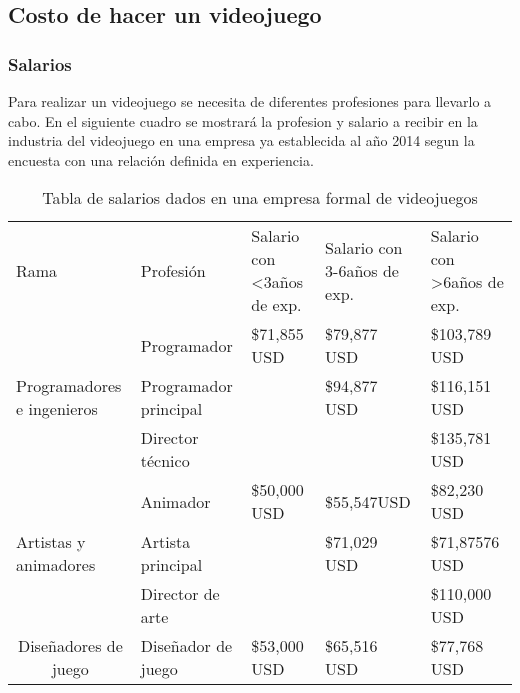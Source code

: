 \subsection{Costo de hacer un videojuego}\label{costoVJ}

	
\subsubsection{Salarios}
Para realizar un videojuego se necesita de diferentes profesiones para llevarlo a cabo.
En el siguiente cuadro se mostrará la profesion y salario a recibir en la industria del videojuego en una empresa ya establecida al año 2014 segun la encuesta con una relación definida en experiencia.

\begin{table}[]
	\centering
	\caption{Tabla de salarios dados en una empresa formal de videojuegos}
	\label{tablacostos}
	\begin{tabular}{lllll}
		Rama                                                      & Profesión                   & Salario con \textless 3años de exp. & Salario con 3-6años de exp. & Salario con \textgreater 6años de exp. \\
		\multirow{3}{*}{Programadores e ingenieros}               & Programador                 & \$71,855 USD                        & \$79,877 USD                & \$103,789 USD                          \\
		& Programador principal       &                                     & \$94,877 USD                & \$116,151 USD                          \\
		& Director técnico            &                                     &                             & \$135,781 USD                          \\
		\multirow{3}{*}{Artistas y animadores}                    & Animador                    & \$50,000 USD                        & \$55,547USD                 & \$82,230 USD                           \\
		& Artista principal           &                                     & \$71,029 USD                & \$71,87576 USD                         \\
		& Director de arte            &                                     &                             & \$110,000 USD                          \\
		\multicolumn{1}{c}{\multirow{2}{*}{Diseñadores de juego}} & Diseñador de juego          & \$53,000 USD                        & \$65,516 USD                & \$77,768 USD                           \\

\end{tabular}
\end{table}

